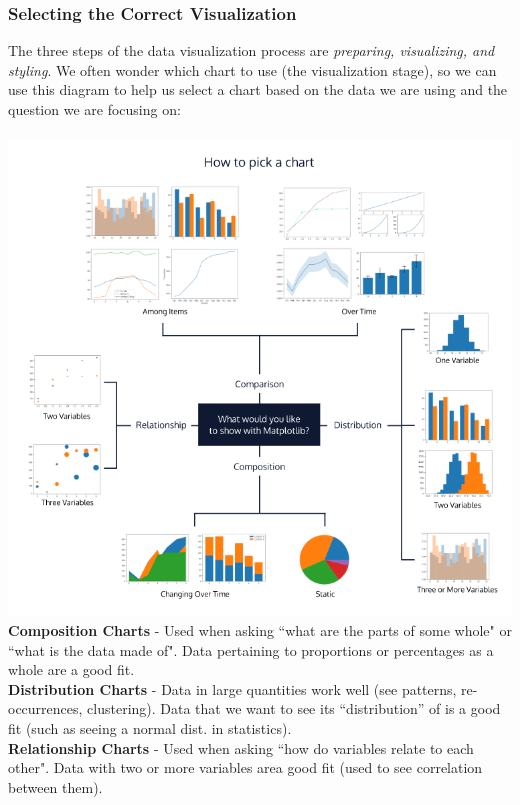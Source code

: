 \documentclass[11pt, a4paper]{article}
\begin{document}
\begin{spacing}{1.1}
	\subsubsection{Selecting the Correct Visualization}
	The three steps of the data visualization process are \textit{preparing, visualizing, and styling}. We often wonder which chart to use (the visualization stage), so we can use this diagram to help us select a chart based on the data we are using and the question we are focusing on: \\~\\
	\includegraphics[scale=.8]{visdiag} \\
	\textbf{Composition Charts} - Used when asking ``what are the parts of some whole" or ``what is the data made of". Data pertaining to proportions or percentages as a whole are a good fit. \vspace*{2mm} \\
	\textbf{Distribution Charts} - Data in large quantities work well (see patterns, re-occurrences, clustering). Data that we want to see its ``distribution'' of is a good fit (such as seeing a normal dist. in statistics). \vspace*{2mm} \\
	\textbf{Relationship Charts} - Used when asking ``how do variables relate to each other". Data with two or more variables area good fit (used to see correlation between them). \vspace*{2mm} \\

\end{spacing}
\end{document}
